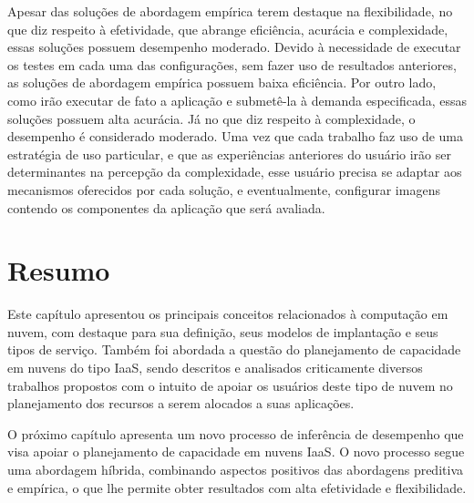 Apesar das soluções de abordagem empírica terem destaque na flexibilidade, no que
diz respeito à efetividade, que abrange eficiência, acurácia e complexidade,
essas soluções possuem desempenho moderado. Devido à necessidade de executar os testes em
cada uma das configurações, sem fazer uso de resultados anteriores, as soluções
de abordagem empírica possuem baixa eficiência. Por outro lado, como irão
executar de fato a aplicação e submetê-la à demanda especificada, essas soluções
possuem alta acurácia. Já no que diz respeito à complexidade, o desempenho é
considerado moderado. Uma vez que cada trabalho faz uso de uma estratégia
de uso particular, e que as experiências anteriores do usuário irão ser
determinantes na percepção da complexidade, esse usuário precisa se adaptar aos mecanismos oferecidos por cada solução, e eventualmente, configurar imagens contendo os
componentes da aplicação que será avaliada.

\section{Resumo}

Este capítulo apresentou os principais conceitos relacionados à computação em nuvem, com destaque para sua definição, seus modelos de implantação e seus tipos de serviço. Também foi abordada a questão do planejamento de capacidade em nuvens do tipo IaaS, sendo descritos e analisados criticamente diversos trabalhos propostos com o intuito de apoiar os usuários deste tipo de nuvem no planejamento dos recursos a serem alocados a suas aplicações.


O próximo capítulo apresenta um novo processo de inferência de desempenho que visa apoiar o planejamento de capacidade em nuvens IaaS. O novo processo segue uma abordagem híbrida, combinando aspectos positivos das abordagens preditiva e empírica, o que lhe permite obter resultados com alta efetividade e flexibilidade. 








